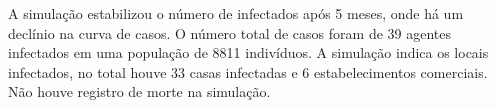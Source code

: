 

A simulação estabilizou o número de infectados após 5 meses, onde há um declínio na curva de casos. O número total de casos foram de 39 agentes infectados em uma população de 8811 indivíduos. A simulação indica os locais infectados, no total houve 33 casas infectadas e 6 estabelecimentos comerciais. Não houve registro de morte na simulação.






